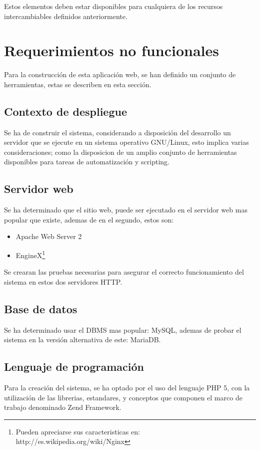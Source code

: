 Estos elementos deben estar disponibles para cualquiera de los recursos
intercambiables definidos anteriormente.

\section{Requerimientos no funcionales}

Para la construcción de esta aplicación web, se han definido un conjunto de
herramientas, estas se describen en esta sección.

\subsection{Contexto de despliegue}
Se ha de construir el sistema, considerando a disposición del desarrollo un
servidor que se ejecute en un sistema operativo GNU/Linux, esto implica varias
consideraciones; como la disposicion de un amplio conjunto de
herramientas disponibles para tareas de automatización y scripting.

\subsection{Servidor web}
Se ha determinado que el sitio web, puede ser ejecutado en el servidor web mas
popular que existe, ademas de en el segundo, estos son:

\begin{itemize}
\item Apache Web Server 2
\item EngineX\footnote{Pueden apreciarse sus caracteristicas en:
http://es.wikipedia.org/wiki/Nginx}
\end{itemize}

Se crearan las pruebas necesarias para asegurar el correcto funcionamiento del
sistema en estos dos servidores HTTP.

\subsection{Base de datos}

Se ha determinado usar el DBMS mas popular: MySQL, ademas de probar el sistema
en la versión alternativa de este: MariaDB.

\subsection{Lenguaje de programación}

Para la creación del sistema, se ha optado por el uso del lenguaje PHP 5, con la
utilización de las librerias, estandares, y conceptos  que componen el marco
de trabajo denominado Zend Framework.


